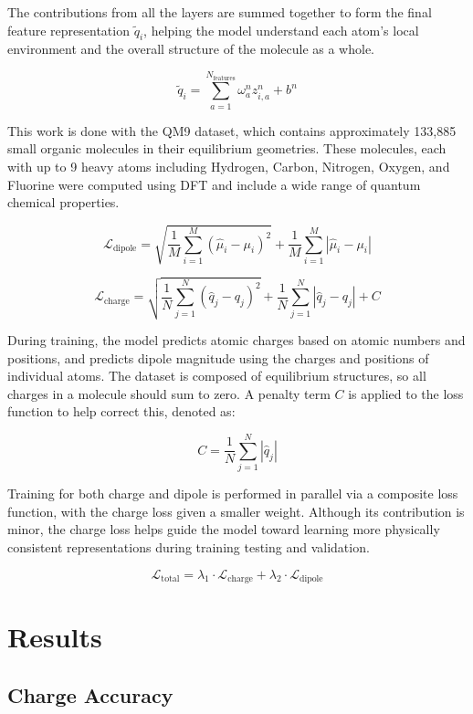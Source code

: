 \documentclass[journal=jctcce,manuscript=article]{achemso}
\begin{document}
The contributions from all the layers are summed together to form the final feature representation $\tilde{q}_i$, helping the model understand each atom’s local environment  and the overall structure of the molecule as a whole.

\begin{equation}
\tilde{q}_i = \sum_{a=1}^{N_{\text{features}}} \omega_a^n z_{i,a}^n + b^n
\end{equation}





This work is done with the QM9 dataset, which contains approximately 133,885 small organic molecules in their equilibrium geometries. These molecules, each with up to 9 heavy atoms including Hydrogen, Carbon, Nitrogen, Oxygen, and Fluorine were computed using DFT and include a wide range of quantum chemical properties.

\[
\mathcal{L}_{\text{dipole}} = \sqrt{ \frac{1}{M} \sum_{i=1}^{M} (\hat{\mu}_i - \mu_i)^2 } + \frac{1}{M} \sum_{i=1}^{M} |\hat{\mu}_i - \mu_i|
\]

\[
\mathcal{L}_{\text{charge}} = \sqrt{ \frac{1}{N} \sum_{j=1}^{N} (\hat{q}_j - q_j)^2 } + \frac{1}{N} \sum_{j=1}^{N} |\hat{q}_j - q_j| + C
\]

During training, the model predicts atomic charges based on atomic numbers and positions, and predicts dipole magnitude using the charges and positions of individual atoms. The dataset is composed of equilibrium structures, so all charges in a molecule should sum to zero. A penalty term \( C \) is applied to the loss function to help correct this, denoted as:

\[
C = \frac{1}{N} \sum_{j=1}^{N} |\hat{q}_j|
\]

Training for both charge and dipole is performed in parallel via a composite loss function, with the charge loss given a smaller weight. Although its contribution is minor, the charge loss helps guide the model toward learning more physically consistent representations during training testing and validation.

\[
\mathcal{L}_{\text{total}} = \lambda_1 \cdot \mathcal{L}_{\text{charge}} + \lambda_2 \cdot \mathcal{L}_{\text{dipole}}
\]



\section{Results}
\subsection{Charge Accuracy}
\end{document}
